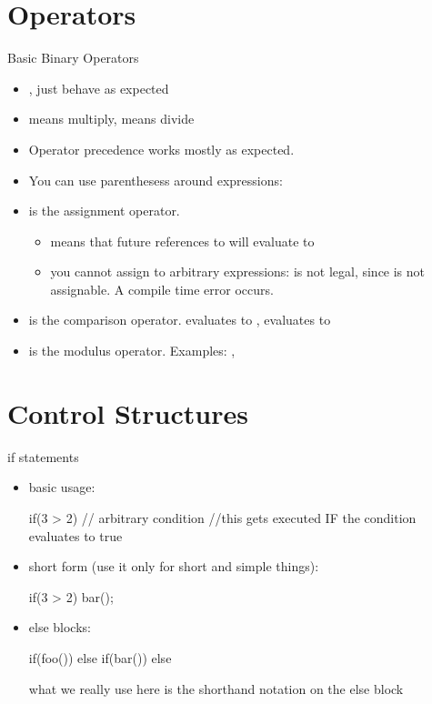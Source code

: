 \documentclass[10pt,graphics,aspectratio=169,table]{beamer}
\begin{document}
\section{Operators}
\begin{frame}[fragile]{Basic Binary Operators}
    \begin{itemize}
        \item \code{+}, \code{-} just behave as expected 
        \item \code{*} means multiply, \code{/} means divide
        \item Operator precedence works mostly as expected.
        \item You can use parenthesess around expressions: 
        \item \code{=} is the assignment operator.
        \begin{itemize}
            \item 
                 means that future references to 
                will evaluate to 
            \item 
                you cannot assign to arbitrary expressions:
                 is not legal, since  
                is not assignable. A compile time error occurs.
        \end{itemize}
        \item \code{==} is the comparison operator. 
             evaluates to , 
             evaluates to 
        \item 
            \code{\%} is the modulus operator. 
            Examples: , 
    \end{itemize}
\end{frame}

\section{Control Structures}
\begin{frame}[fragile]{if statements}
    \begin{itemize}
    \item basic usage:
        \begin{codeblock} 
if(3 > 2){  // arbitrary condition
    //this gets executed IF the condition evaluates to true
}
        \end{codeblock}
    \item short form (use it only for short and simple things):
        \begin{codeblock} 
if(3 > 2) bar();
        \end{codeblock}

    \item else blocks:
        \begin{codeblock} 
if(foo()){ 
}
else if(bar()){ 
}
else{ 
}
        \end{codeblock}

        what we really use here is the shorthand notation on the else block

    \end{itemize}
\end{frame}
\end{document}
